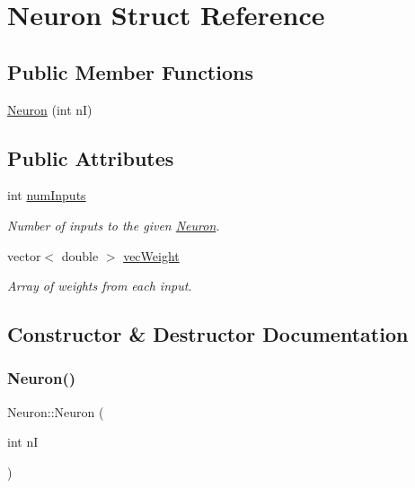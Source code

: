\hypertarget{struct_neuron}{}\section{Neuron Struct Reference}
\label{struct_neuron}
\subsection*{Public Member Functions}
\begin{DoxyCompactItemize}
\item 
\hyperlink{struct_neuron_ad748d6c737ad37c00bb6d9a75ede221d}{Neuron} (int nI)
\end{DoxyCompactItemize}
\subsection*{Public Attributes}
\begin{DoxyCompactItemize}
\item 
\hypertarget{struct_neuron_a09992eeceb974593f5bf557aae581d2d}{}\label{struct_neuron_a09992eeceb974593f5bf557aae581d2d} 
int \hyperlink{struct_neuron_a09992eeceb974593f5bf557aae581d2d}{num\+Inputs}
\begin{DoxyCompactList}\small\item\em Number of inputs to the given \hyperlink{struct_neuron}{Neuron}. \end{DoxyCompactList}\item 
\hypertarget{struct_neuron_abc0dcf719541568ee5fa4201d1e3d4b4}{}\label{struct_neuron_abc0dcf719541568ee5fa4201d1e3d4b4} 
vector$<$ double $>$ \hyperlink{struct_neuron_abc0dcf719541568ee5fa4201d1e3d4b4}{vec\+Weight}
\begin{DoxyCompactList}\small\item\em Array of weights from each input. \end{DoxyCompactList}\end{DoxyCompactItemize}


\subsection{Constructor \& Destructor Documentation}
\hypertarget{struct_neuron_ad748d6c737ad37c00bb6d9a75ede221d}{}\label{struct_neuron_ad748d6c737ad37c00bb6d9a75ede221d} 
\subsubsection{\texorpdfstring{Neuron()}{Neuron()}}
{\footnotesize\ttfamily Neuron\+::\+Neuron (\begin{DoxyParamCaption}\item[{int}]{nI }\end{DoxyParamCaption})}

